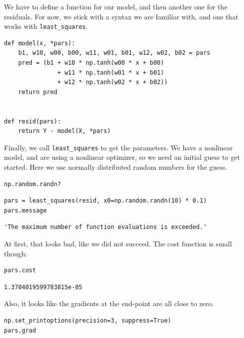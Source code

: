 \documentclass[11pt]{article}
\begin{document}
We have to define a function for our model, and then another one for the residuals. For now, we stick with a syntax we are familiar with, and one that works with \texttt{least\_squares}.

\begin{verbatim}
def model(x, *pars):
    b1, w10, w00, b00, w11, w01, b01, w12, w02, b02 = pars
    pred = (b1 + w10 * np.tanh(w00 * x + b00)
               + w11 * np.tanh(w01 * x + b01)
               + w12 * np.tanh(w02 * x + b02))
    return pred


def resid(pars):
    return Y - model(X, *pars)
\end{verbatim}

Finally, we call \texttt{least\_squares} to get the parameters. We have a nonlinear model, and are using a nonlinear optimizer, so we need an initial guess to get started. Here we use normally distributed random numbers for the guess.

\begin{verbatim}
np.random.randn?
\end{verbatim}

\begin{verbatim}
pars = least_squares(resid, x0=np.random.randn(10) * 0.1)
pars.message
\end{verbatim}

\begin{verbatim}
'The maximum number of function evaluations is exceeded.'
\end{verbatim}

At first, that looks bad, like we did not succeed. The cost function is small though:

\begin{verbatim}
pars.cost
\end{verbatim}

\begin{verbatim}
1.3704019599783815e-05
\end{verbatim}

Also, it looks like the gradients at the end-point are all close to zero.

\begin{verbatim}
np.set_printoptions(precision=3, suppress=True)
pars.grad
\end{verbatim}
\end{document}
